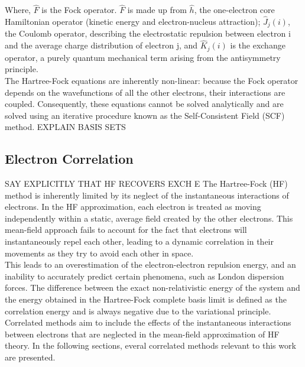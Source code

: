 Where, $\hat{F}$ is the Fock operator. $\hat{F}$ is made up from $\hat{h}$, the one-electron core Hamiltonian operator (kinetic energy and electron-nucleus attraction); $\hat{J}_j(i)$, the Coulomb operator, describing the electrostatic repulsion between electron i and the average charge distribution of electron j, and $\hat{K}_j(i)$ is the exchange operator, a purely quantum mechanical term arising from the antisymmetry principle. \\
The Hartree-Fock equations are inherently non-linear: because the Fock operator depends on the wavefunctions of all the other electrons, their interactions are coupled. Consequently, these equations cannot be solved analytically and are solved using an iterative procedure known as the Self-Consistent Field (SCF) method.
EXPLAIN BASIS SETS
\subsection{Electron Correlation}
\label{subsec:electron_correlation}
SAY EXPLICITLY THAT HF RECOVERS EXCH E
The Hartree-Fock (HF) method is inherently limited by its neglect of the instantaneous interactions of electrons. In the HF approximation, each electron is treated as moving independently within a static, average field created by the other electrons. This mean-field approach fails to account for the fact that electrons will instantaneously repel each other, leading to a dynamic correlation in their movements as they try to avoid each other in space.\\
This leads to an overestimation of the electron-electron repulsion energy, and an inability to accurately predict certain phenomena, such as London dispersion forces. The difference between the exact non-relativistic energy of the system and the energy obtained in the Hartree-Fock complete basis limit is defined as the correlation energy and is always negative due to the variational principle. Correlated methods aim to include the effects of the instantaneous interactions between electrons that are neglected in the mean-field approximation of HF theory. In the following sections, everal correlated methods relevant to this work are presented.

